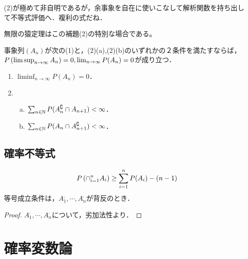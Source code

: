\documentclass[uplatex,dvipdfmx]{jsreport}
\begin{document}
\begin{remarks}[どうやら洗練された証明はこの一通りである]
    (2)が極めて非自明であるが，余事象を自在に使いこなして解析関数を持ち出して不等式評価へ．複利の式だね．
\end{remarks}
\begin{example}
    無限の猿定理はこの補題(2)の特別な場合である。
\end{example}

\begin{corollary}
    事象列$(A_n)$が次の(1)と，(2)(a),(2)(b)のいずれかの２条件を満たすならば，$P\left(\limsup_{n\to\infty}A_n\right)=0,\lim_{n\to\infty}P(A_n)=0$が成り立つ．
    \begin{enumerate}
        \item $\liminf_{n\to\infty}P(A_n)=0$．
        \item \begin{enumerate}[(a)]
            \item $\sum_{n\in\mathbb{N}}P(A^\complement_n\cap A_{n+1})<\infty$．
            \item $\sum_{n\in\mathbb{N}}P(A_n\cap A^\complement_{n+1})<\infty$．
        \end{enumerate}
    \end{enumerate}
\end{corollary}

\subsection{確率不等式}

\begin{tcolorbox}[colframe=ForestGreen, colback=ForestGreen!10!white,breakable,colbacktitle=ForestGreen!40!white,coltitle=black,fonttitle=\bfseries\sffamily,
title=有界測度論としては初等的でも，確率論的には非自明で名前がほしい結果は多い]
    
\end{tcolorbox}

\begin{proposition}[Bonferroniの不等式]
    \[P\left(\cap_{i=1}^nA_i\right)\ge\sum^n_{i=1}P(A_i)-(n-1)\]
    等号成立条件は，$A^\comp_1,\cdots,A^\comp_n$が背反のとき．
\end{proposition}
\begin{proof}
    $A^\comp_1,\cdots,A^\comp_n$について，劣加法性より．
\end{proof}

\section{確率変数論}
\end{document}
